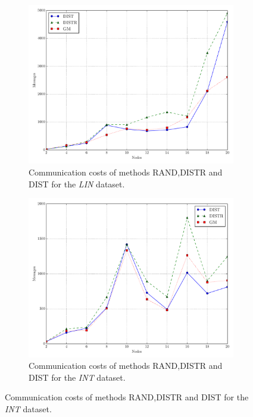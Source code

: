 \begin{figure}[!htb]
\begin{subfigure}{0.32\textwidth}
  \includegraphics[width=\linewidth]{img/matching_msg_linear.pdf}
  \caption{Communication costs of methods RAND,DISTR and DIST for the \emph{LIN} dataset.}
\end{subfigure}\hfill
\begin{subfigure}{0.32\textwidth}
  \includegraphics[width=\linewidth]{img/matching_msg_interweaving.pdf}
  \caption{Communication costs of methods RAND,DISTR and DIST for the \emph{INT} dataset.}

\end{subfigure}
\end{figure}
